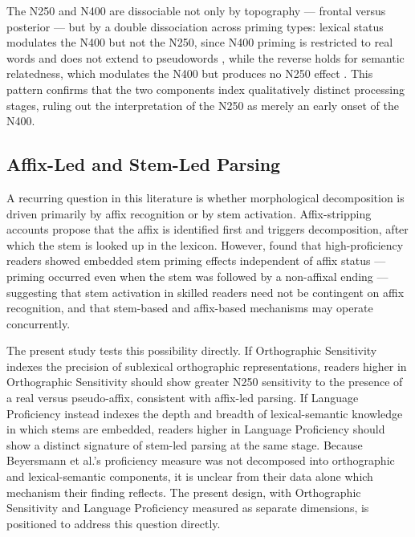 \documentclass[utf8]{FrontiersinHarvard} %
\begin{document}
	The N250 and N400 are dissociable not only by topography --- frontal versus posterior \citep{holcombTimeCourseVisual2006} --- but by a double dissociation across priming types: lexical status modulates the N400 but not the N250, since N400 priming is restricted to real words and does not extend to pseudowords \citep{kiyonagaMaskedCrossmodalRepetition2007}, while the reverse holds for semantic relatedness, which modulates the N400 but produces no N250 effect \citep{graingerWatchingWordGo2009}. This pattern confirms that the two components index qualitatively distinct processing stages, ruling out the interpretation of the N250 as merely an early onset of the N400.

	\subsection{Affix-Led and Stem-Led Parsing}

	A recurring question in this literature is whether morphological decomposition is driven primarily by affix recognition or by stem activation. Affix-stripping accounts \citep{taft_lexical_1975, rastleMorphologicalDecompositionBased2008} propose that the affix is identified first and triggers decomposition, after which the stem is looked up in the lexicon. However, \citet{beyersmannEmbeddedStemPriming2016} found that high-proficiency readers showed embedded stem priming effects independent of affix status --- priming occurred even when the stem was followed by a non-affixal ending --- suggesting that stem activation in skilled readers need not be contingent on affix recognition, and that stem-based and affix-based mechanisms may operate concurrently.

	The present study tests this possibility directly. If Orthographic Sensitivity indexes the precision of sublexical orthographic representations, readers higher in Orthographic Sensitivity should show greater N250 sensitivity to the presence of a real versus pseudo-affix, consistent with affix-led parsing. If Language Proficiency instead indexes the depth and breadth of lexical-semantic knowledge in which stems are embedded, readers higher in Language Proficiency should show a distinct signature of stem-led parsing at the same stage. Because Beyersmann et al.'s proficiency measure was not decomposed into orthographic and lexical-semantic components, it is unclear from their data alone which mechanism their finding reflects. The present design, with Orthographic Sensitivity and Language Proficiency measured as separate dimensions, is positioned to address this question directly.
\end{document}
